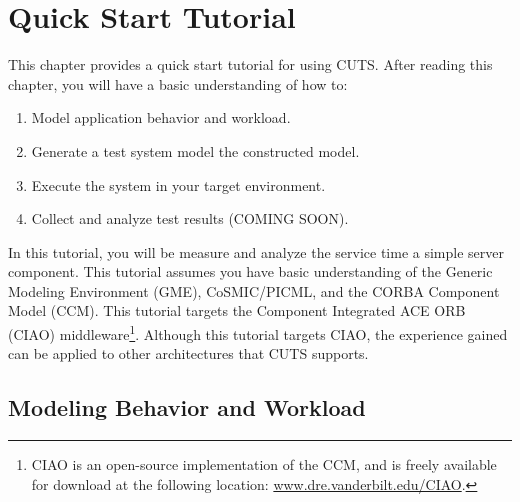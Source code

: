 
\chapter{Quick Start Tutorial}

This chapter provides a quick start tutorial for using CUTS. After 
reading this chapter, you will have a basic understanding of how to:
\begin{enumerate}
  \item Model application behavior and workload.

  \item Generate a test system model the constructed model.

  \item Execute the system in your target environment.

  \item Collect and analyze test results (COMING SOON).
\end{enumerate}

In this tutorial, you will be measure and analyze the service time 
a simple server component. This tutorial assumes you have basic 
understanding of the Generic Modeling Environment (GME), CoSMIC/\-PICML, 
and the CORBA Component Model (CCM). This tutorial targets the 
Component Integrated ACE ORB (CIAO) middleware\footnote{CIAO is 
an open-source implementation of the CCM, and is freely available 
for download at the following location: \url{www.dre.vanderbilt.edu/CIAO}.}. 
Although this tutorial targets CIAO, the experience gained can be 
applied to other architectures that CUTS supports.

\section{Modeling Behavior and Workload}
\label{sec:quickstart-modeling}

